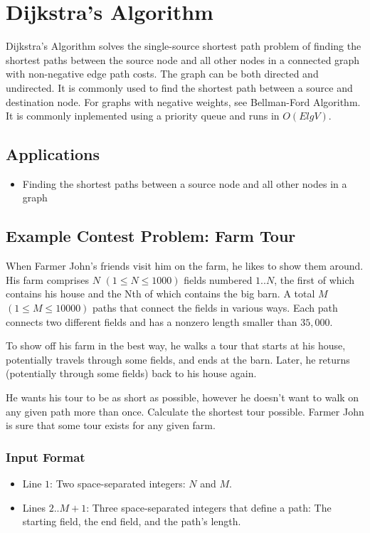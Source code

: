 \section{Dijkstra's Algorithm}
Dijkstra's Algorithm solves the single-source shortest path problem of finding the shortest paths between the source 
node and all other nodes in a connected graph with non-negative edge path costs.  
The graph can be both directed and undirected.  
It is commonly used to find the shortest path between a source and destination node.  
For graphs with negative weights, see Bellman-Ford Algorithm.
It is commonly inplemented using a priority queue and runs in $O(E lg V)$.

\subsection{Applications}

\begin{itemize}
	\item  Finding the shortest paths between a source node and all other nodes in a graph
\end{itemize}

\subsection{Example Contest Problem: Farm Tour\cite{farmtour}}
When Farmer John's friends visit him on the farm, he likes to show them around. 
His farm comprises $N$ $(1 \leq N \leq 1000)$ fields numbered $1..N$, the first of which contains his house and the Nth of which contains the big barn. 
A total $M$ $(1 \leq M \leq 10000)$ paths that connect the fields in various ways. 
Each path connects two different fields and has a nonzero length smaller than $35,000$. 

To show off his farm in the best way, he walks a tour that starts at his house, potentially travels through some fields, and ends at the barn. 
Later, he returns (potentially through some fields) back to his house again. 

He wants his tour to be as short as possible, however he doesn't want to walk on any given path more than once. 
Calculate the shortest tour possible. 
Farmer John is sure that some tour exists for any given farm.

\subsubsection{Input Format}
\begin{itemize}
	\item Line $1$: Two space-separated integers: $N$ and $M$. 
	\item Lines $2..M+1$: Three space-separated integers that define a path: The starting field, the end field, and the path's length. 
\end{itemize}

